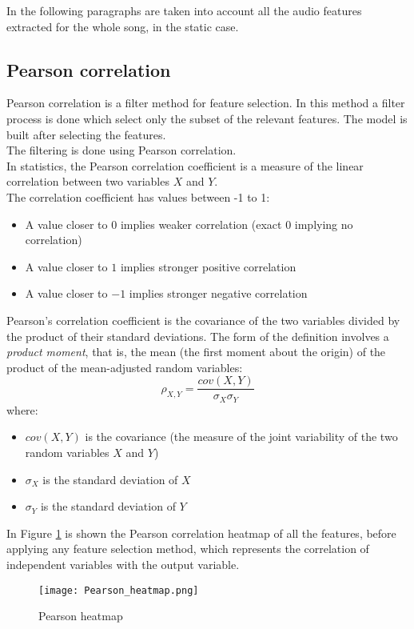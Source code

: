 In the following paragraphs are taken into account all the audio features extracted for the whole song, in the static case.

\subsection{Pearson correlation}
Pearson correlation is a filter method for feature selection. In this method a filter process is done which select only the subset of the relevant features. The model is built after selecting the features.
\\
The filtering is done using Pearson correlation.
\\ \indent
In statistics, the Pearson correlation coefficient is a measure of the linear correlation between two variables $X$ and $Y$.
\\
The correlation coefficient has values between -1 to 1:
\begin{itemize}
	\item A value closer to $0$ implies weaker correlation (exact $0$ implying no correlation)
	\item A value closer to $1$ implies stronger positive correlation
	\item A value closer to $-1$ implies stronger negative correlation
\end{itemize}
Pearson's correlation coefficient is the covariance of the two variables divided by the product of their standard deviations. The form of the definition involves a \textit{product moment}, that is, the mean (the first moment about the origin) of the product of the mean-adjusted random variables:
\begin{equation}
	\rho_{X,Y}=\dfrac{cov(X,Y)}{\sigma_X \sigma_Y}
\end{equation}
where:
\begin{itemize}
	\item $cov(X,Y)$ is the covariance (the measure of the joint variability of the two random variables $X$ and $Y$)
	\item $\sigma_X$ is the standard deviation of $X$
	\item $\sigma_Y$ is the standard deviation of $Y$
\end{itemize}
In Figure \ref{fig:Pearson_heatmap} is shown the Pearson correlation heatmap of all the features, before applying any feature selection method, which represents the correlation of independent variables with the output variable.
\begin{figure}[h]
    \centering
    \texttt{[image: Pearson\_heatmap.png]} 
	\caption{Pearson heatmap}
    \label{fig:Pearson_heatmap}
\end{figure}
